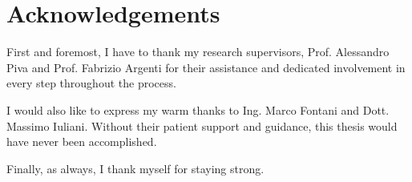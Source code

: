 \chapter*{Acknowledgements}

First and foremost, I have to thank my research supervisors, Prof. Alessandro Piva and Prof. Fabrizio Argenti for their assistance and dedicated involvement in every step throughout the process.

I would also like to express my warm thanks to Ing. Marco Fontani and Dott. Massimo Iuliani. Without their patient support and guidance,  this thesis would have never been accomplished.

Finally, as always, I thank myself for staying strong.